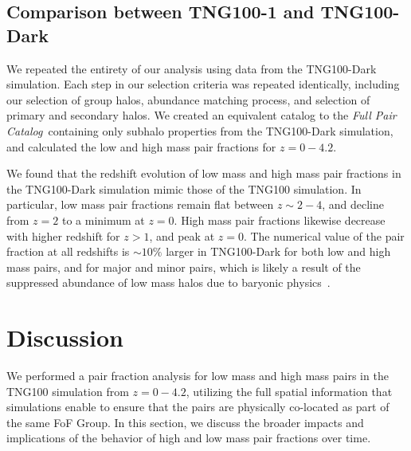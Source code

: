\documentclass[twocolumn]{aastex631}
\newcommand{\paircat}{\textit{Full Pair Catalog}}
\begin{document}
    \subsection{Comparison between TNG100-1 and TNG100-Dark}\label{sec:disc-dark}
    We repeated the entirety of our analysis using data from the TNG100-Dark simulation.
    Each step in our selection criteria was repeated identically, including our selection of group halos, abundance matching process, and selection of primary and secondary halos.
    We created an equivalent catalog to the \paircat\ containing only subhalo properties from the TNG100-Dark simulation, and calculated the low and high mass pair fractions for $z=0-4.2$. 

    We found that the redshift evolution of low mass and high mass pair fractions in the TNG100-Dark simulation mimic those of the TNG100 simulation. 
    In particular, low mass pair fractions remain flat between $z\sim2-4$, and decline from $z=2$ to a minimum at $z=0$. 
    High mass pair fractions likewise decrease with higher redshift for $z>1$, and peak at $z=0$.
    The numerical value of the pair fraction at all redshifts is $\sim10\%$ larger in TNG100-Dark for both low and high mass pairs, and for major and minor pairs, which is likely a result of the suppressed abundance of low mass halos due to baryonic physics~\citep{chua17}. 


\section{Discussion}\label{sec:discussion}
We performed a pair fraction analysis for low mass and high mass pairs in the TNG100 simulation from $z=0-4.2$, utilizing the full spatial information that simulations enable to ensure that the pairs are physically co-located as part of the same FoF Group. 
In this section, we discuss the broader impacts and implications of the behavior of high and low mass pair fractions over time.
\end{document}
